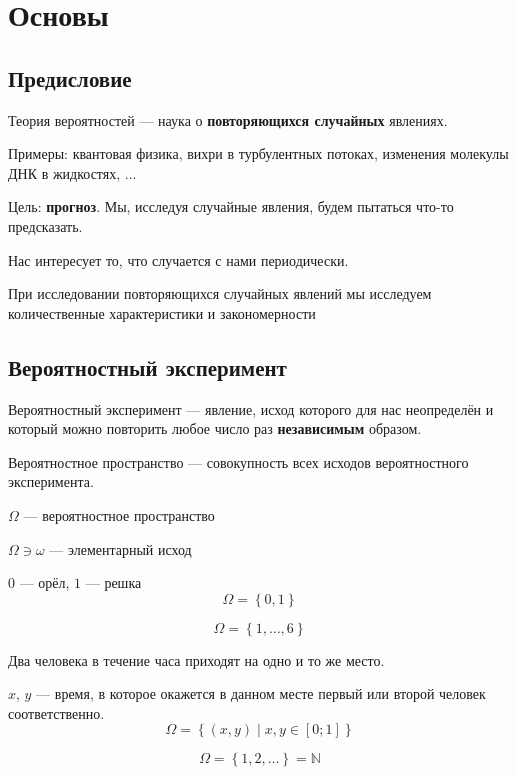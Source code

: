 \chapter{Основы}

\section{Предисловие}
Теория вероятностей --- наука о \textbf{повторяющихся случайных} явлениях.

Примеры: квантовая физика, вихри в турбулентных потоках,
изменения молекулы ДНК в жидкостях, ...

Цель: \textbf{прогноз}. Мы, исследуя случайные явления,
будем пытаться что-то предсказать.

Нас интересует то, что случается с нами периодически.

При исследовании повторяющихся случайных явлений мы исследуем
количественные характеристики и закономерности

\section{Вероятностный эксперимент}
\begin{definition}
Вероятностный эксперимент --- явление, исход которого для нас неопределён
и который можно повторить любое число раз \textbf{независимым} образом.
\end{definition}
\begin{definition}
Вероятностное пространство --- совокупность всех исходов
вероятностного эксперимента.
\end{definition}
$\Omega$ --- вероятностное пространство

$\Omega \ni \omega$ --- элементарный исход

\begin{example}
$0$ --- орёл, $1$ --- решка
$$\Omega = \left\{ 0, 1 \right\}$$
\end{example}
\begin{example}
$$\Omega = \left\{ 1, \dots, 6 \right\}$$
\end{example}
\begin{example}
Два человека в течение часа приходят на одно и то же место.

$x$, $y$ --- время, в которое окажется в данном месте
первый или второй человек соответственно.
$$\Omega = \left\{ \left(x,y\right) \mid x,y \in [0;1] \right\}$$
\end{example}
\begin{example}
$$\Omega = \left\{ 1,2, \dots \right\} =  \mathbb{N}$$
\end{example}
